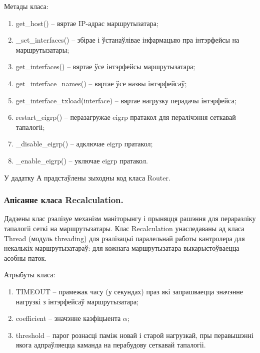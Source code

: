 Метады класа:
\begin{enumerate}
    \item get\_host() -- вяртае IP-адрас маршрутызатара;
    \item \_set\_interfaces() -- збірае і ўстанаўлівае інфармацыю пра інтэрфейсы на маршрутызатары;
    \item get\_interfaces() -- вяртае ўсе інтэрфейсы маршрутызатара;
    \item get\_interface\_names() -- вяртае ўсе назвы інтэрфейсаў;
    \item get\_interface\_txload(interface) -- вяртае нагрузку перадачы інтэрфейса;
    \item restart\_eigrp() -- перазагружае eigrp пратакол для пералічэння сеткавай тапалогіі;
    \item \_disable\_eigrp() -- адключае eigrp пратакол;
    \item \_enable\_eigrp() -- уключае eigrp пратакол.
\end{enumerate}

У дадатку А прадстаўлены зыходны код класа Router.

%


\subsubsection{Апісанне класа Recalculation.}

Дадзены клас рэалізуе механізм маніторынгу і прыняцця рашэння для пераразліку тапалогіі сеткі на маршрутызатары.
Клас Recalculation унаследаваны ад класа Thread (модуль threading) для рэалізацыі паралельнай работы кантролера для
некалькіх маршрутызатараў: для кожнага маршрутызатара выкарыстоўваецца асобны паток.

Атрыбуты класа:
\begin{enumerate}
    \item TIMEOUT -- прамежак часу (у секундах) праз які запрашваецца значэнне нагрузкі з інтэрфейсаў маршрутызатара;
    \item coefficient -- значэнне каэфіцыента $\alpha$;
    \item threshold -- парог рознасці паміж новай і старой нагрузкай, пры
    перавышэнні якога адпраўляецца каманда на перабудову сеткавай тапалогіі.
\end{enumerate}


